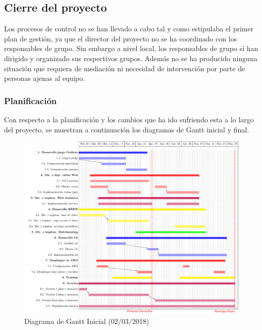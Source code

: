 \subsection{Cierre del proyecto}
\label{Cierre del proyecto}
Los procesos de control no se han llevado a cabo tal y como estipulaba el primer plan de gestión, ya que el director del proyecto no se ha coordinado con los responsables de grupo. Sin embargo a nivel local, los responsables de grupo sí han dirigido y organizado sus respectivos grupos. Además no se ha producido ninguna situación que requiera de mediación ni necesidad de intervención por parte de personas ajenas al equipo.
\subsubsection{Planificación}
Con respecto a la planificación y los cambios que ha ido sufriendo esta a lo largo del proyecto, se muestran a continuación los diagramas de Gantt inicial y final.\\

\begin{figure}[H]
	\centering
	\includegraphics[scale=0.6]{figuras/gantt-viejo.pdf}
	\caption{Diagrama de Gantt Inicial (02/03/2018)}
\end{figure}

